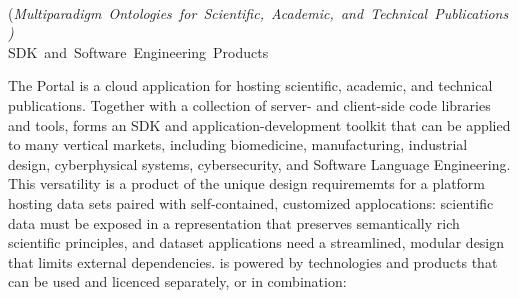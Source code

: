 \documentclass[11pt,letterpaper]{article}
\begin{document}
\vspace*{-6em}

\begin{center}
{}\\
\vspace{8pt}
\mbox{(\textit{Multiparadigm Ontologies for 
Scientific, Academic, and Technical Publications)}}\\\vspace{8pt}
\mbox{{\Large SDK and Software Engineering Products}}\\\vspace{13pt}
\end{center}

\vspace*{.2em}

The {\MOSAIC} Portal is a cloud application for hosting 
scientific, academic, and 
technical publications.  Together with a collection 
of server- and client-side code libraries and tools, 
{\MOSAIC} forms an SDK and application-development 
toolkit that can be applied to many vertical markets, 
including biomedicine, manufacturing, industrial design, 
cyberphysical systems, cybersecurity, and Software 
Language Engineering.  This versatility is a product 
of the unique design requirememts for a platform 
hosting data sets paired with 
self-contained, customized applocations: scientific 
data must be exposed in a representation that preserves 
semantically rich scientific principles, and 
dataset applications need a streamlined, modular 
design that limits external dependencies.
\p{}
{\lfMOSAIC} is powered by technologies and products that can 
be used and licenced separately, or in combination: 
\end{document}
